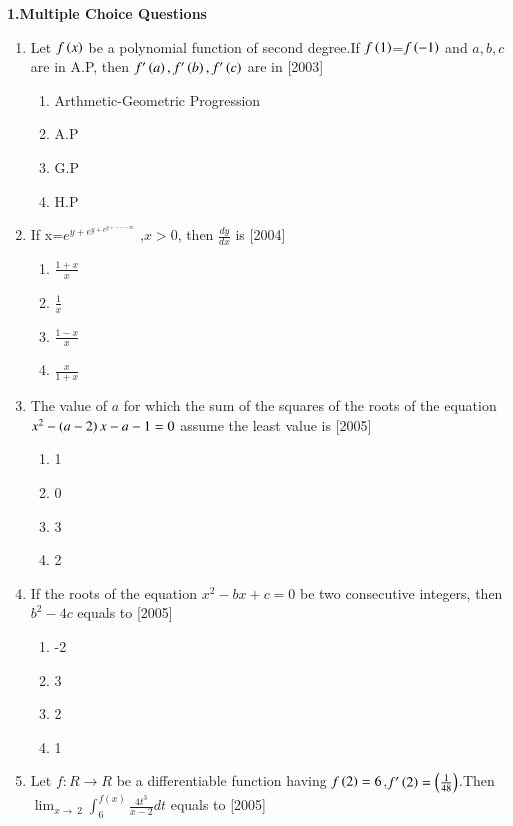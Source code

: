 \documentclass[journal,12pt,twocolumn]{IEEEtran}
\theoremstyle{remark}
\begin{document}
\maketitle \textbf{1.Multiple Choice Questions}
\begin{enumerate}
    \item Let $f\left(x\right)$ be a polynomial function of second degree.If $f\left(1\right)$=$f\left(-1\right)$ and $a,b,c$ are in A.P, then $f^{\prime} \left(a\right),f^{\prime}\left(b\right),f^{\prime}\left(c\right)$ are in
    \hfill[2003]
    \begin{enumerate}
    \item Arthmetic-Geometric Progression
    \item A.P
    \item G.P
    \item H.P\\
    
    \end{enumerate}
    \item If x=$e^{y+e^{y+e^{y+---\infty}}}$ ,$x>0$, then $\frac{dy}{dx}$ is
    \hfill[2004]
    
    \begin{multicols}{4}
    \begin{enumerate}
    \item $\frac{1+x}{x}$
    \item $\frac{1}{x}$
    \item $\frac{1-x}{x}$
    \item $\frac{x}{1+x}$
\end{enumerate}
\end{multicols}
\item The value of $a$ for which the sum of the squares of the roots of the equation $x^2-\left(a-2\right)x-a-1=0$ assume the least value is
\hfill[2005]
\begin{multicols}{4}
\begin{enumerate}
    \item 1
    \item 0
    \item 3
    \item 2
    \end{enumerate}
    \end{multicols}
    \item If the roots of the equation $x^2-bx+c=0$ be   two  consecutive integers, then $b^2-4c$  equals  to
    \hfill[2005]
    \begin{multicols}{4}
    \begin{enumerate}
        \item -2
        \item 3
        \item 2
        \item 1
    \end{enumerate}
    \end{multicols}
    \item Let $f:R\rightarrow R$ be a differentiable function having $f\left(2\right)=6$,$f^{\prime}\left(2\right)=\left(\frac{1}{48}\right)$.Then $\lim_{x\to\ 2} \int_{6}^{f(x)} \frac{4t^3}{x-2} dt$ equals to
    \hfill[2005]
    \begin{multicols}{4}
        

\end{multicols}
\end{enumerate}
\end{document}
